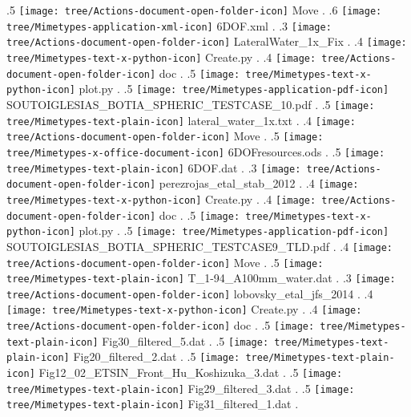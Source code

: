 {.5 { \texttt{[image: tree/Actions-document-open-folder-icon]} Move }.
.6 { \texttt{[image: tree/Mimetypes-application-xml-icon]} 6DOF.xml }.
.3 { \texttt{[image: tree/Actions-document-open-folder-icon]} LateralWater\_1x\_Fix }.
.4 { \texttt{[image: tree/Mimetypes-text-x-python-icon]} Create.py }.
.4 { \texttt{[image: tree/Actions-document-open-folder-icon]} doc }.
.5 { \texttt{[image: tree/Mimetypes-text-x-python-icon]} plot.py }.
.5 { \texttt{[image: tree/Mimetypes-application-pdf-icon]} SOUTOIGLESIAS\_BOTIA\_SPHERIC\_TESTCASE\_10.pdf }.
.5 { \texttt{[image: tree/Mimetypes-text-plain-icon]} lateral\_water\_1x.txt }.
.4 { \texttt{[image: tree/Actions-document-open-folder-icon]} Move }.
.5 { \texttt{[image: tree/Mimetypes-x-office-document-icon]} 6DOFresources.ods }.
.5 { \texttt{[image: tree/Mimetypes-text-plain-icon]} 6DOF.dat }.
.3 { \texttt{[image: tree/Actions-document-open-folder-icon]} perezrojas\_etal\_stab\_2012 }.
.4 { \texttt{[image: tree/Mimetypes-text-x-python-icon]} Create.py }.
.4 { \texttt{[image: tree/Actions-document-open-folder-icon]} doc }.
.5 { \texttt{[image: tree/Mimetypes-text-x-python-icon]} plot.py }.
.5 { \texttt{[image: tree/Mimetypes-application-pdf-icon]} SOUTOIGLESIAS\_BOTIA\_SPHERIC\_TESTCASE9\_TLD.pdf }.
.4 { \texttt{[image: tree/Actions-document-open-folder-icon]} Move }.
.5 { \texttt{[image: tree/Mimetypes-text-plain-icon]} T\_1-94\_A100mm\_water.dat }.
.3 { \texttt{[image: tree/Actions-document-open-folder-icon]} lobovsky\_etal\_jfs\_2014 }.
.4 { \texttt{[image: tree/Mimetypes-text-x-python-icon]} Create.py }.
.4 { \texttt{[image: tree/Actions-document-open-folder-icon]} doc }.
.5 { \texttt{[image: tree/Mimetypes-text-plain-icon]} Fig30\_filtered\_5.dat }.
.5 { \texttt{[image: tree/Mimetypes-text-plain-icon]} Fig20\_filtered\_2.dat }.
.5 { \texttt{[image: tree/Mimetypes-text-plain-icon]} Fig12\_02\_ETSIN\_Front\_Hu\_Koshizuka\_3.dat }.
.5 { \texttt{[image: tree/Mimetypes-text-plain-icon]} Fig29\_filtered\_3.dat }.
.5 { \texttt{[image: tree/Mimetypes-text-plain-icon]} Fig31\_filtered\_1.dat }.
}
